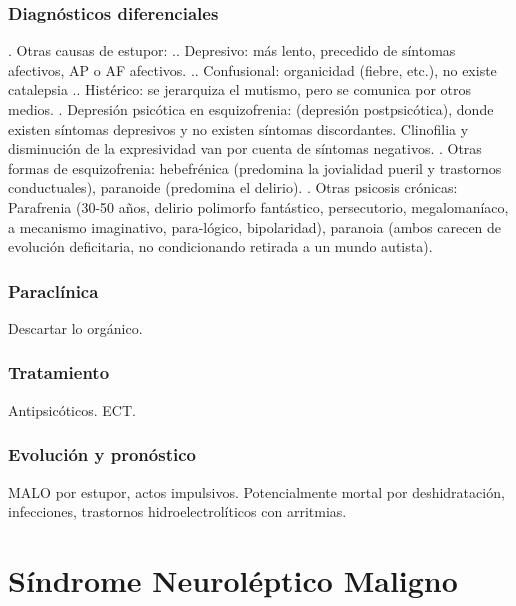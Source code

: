 \documentclass{scrbook}
\begin{document}
\subsection*{Diagnósticos diferenciales}

. Otras causas de estupor:
.. Depresivo: más lento, precedido de síntomas afectivos, AP o AF afectivos.
.. Confusional: organicidad (fiebre, etc.), no existe catalepsia
.. Histérico: se jerarquiza el mutismo, pero se comunica por otros medios.
. Depresión psicótica en esquizofrenia: (depresión postpsicótica), donde existen síntomas depresivos y no existen síntomas discordantes. Clinofilia y disminución de la expresividad van por cuenta de síntomas negativos.
. Otras formas de esquizofrenia: hebefrénica (predomina la jovialidad pueril y trastornos conductuales), paranoide (predomina el delirio).
. Otras psicosis crónicas: Parafrenia (30-50 años, delirio polimorfo fantástico, persecutorio, megalomaníaco, a mecanismo imaginativo, para-lógico, bipolaridad), paranoia (ambos carecen de evolución deficitaria, no condicionando retirada a un mundo autista).
\subsection*{Paraclínica}
Descartar lo orgánico.
\subsection*{Tratamiento}
Antipsicóticos. ECT.
\subsection*{Evolución y pronóstico}
MALO por estupor, actos impulsivos. Potencialmente mortal por deshidratación, infecciones, trastornos hidroelectrolíticos con arritmias.
\chapter{Síndrome Neuroléptico Maligno}
\end{document}
